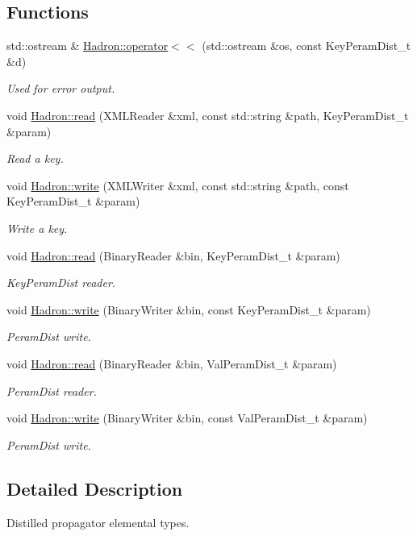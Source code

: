 \subsection*{Functions}
\begin{DoxyCompactItemize}
\item 
std\+::ostream \& \mbox{\hyperlink{namespaceHadron_a42b0be53de314a1cf2c05e7d4d4a34d9}{Hadron\+::operator$<$$<$}} (std\+::ostream \&os, const Key\+Peram\+Dist\+\_\+t \&d)
\begin{DoxyCompactList}\small\item\em Used for error output. \end{DoxyCompactList}\item 
void \mbox{\hyperlink{namespaceHadron_a55b9ba85a8d8e17d95217275193fb013}{Hadron\+::read}} (X\+M\+L\+Reader \&xml, const std\+::string \&path, Key\+Peram\+Dist\+\_\+t \&param)
\begin{DoxyCompactList}\small\item\em Read a key. \end{DoxyCompactList}\item 
void \mbox{\hyperlink{namespaceHadron_a9d260315c8fc49d172ff22fd3abb49c9}{Hadron\+::write}} (X\+M\+L\+Writer \&xml, const std\+::string \&path, const Key\+Peram\+Dist\+\_\+t \&param)
\begin{DoxyCompactList}\small\item\em Write a key. \end{DoxyCompactList}\item 
void \mbox{\hyperlink{namespaceHadron_ac70286e9fd2f4a9ddf81f9235d1812e8}{Hadron\+::read}} (Binary\+Reader \&bin, Key\+Peram\+Dist\+\_\+t \&param)
\begin{DoxyCompactList}\small\item\em Key\+Peram\+Dist reader. \end{DoxyCompactList}\item 
void \mbox{\hyperlink{namespaceHadron_a1f7e7b8c782fddd330a9f4491bd37e22}{Hadron\+::write}} (Binary\+Writer \&bin, const Key\+Peram\+Dist\+\_\+t \&param)
\begin{DoxyCompactList}\small\item\em Peram\+Dist write. \end{DoxyCompactList}\item 
void \mbox{\hyperlink{namespaceHadron_a030f71bff6ae10166b42e24845e0dbf8}{Hadron\+::read}} (Binary\+Reader \&bin, Val\+Peram\+Dist\+\_\+t \&param)
\begin{DoxyCompactList}\small\item\em Peram\+Dist reader. \end{DoxyCompactList}\item 
void \mbox{\hyperlink{namespaceHadron_afebbe26d622d0f830042509739bee2da}{Hadron\+::write}} (Binary\+Writer \&bin, const Val\+Peram\+Dist\+\_\+t \&param)
\begin{DoxyCompactList}\small\item\em Peram\+Dist write. \end{DoxyCompactList}\end{DoxyCompactItemize}


\subsection{Detailed Description}
Distilled propagator elemental types. 

